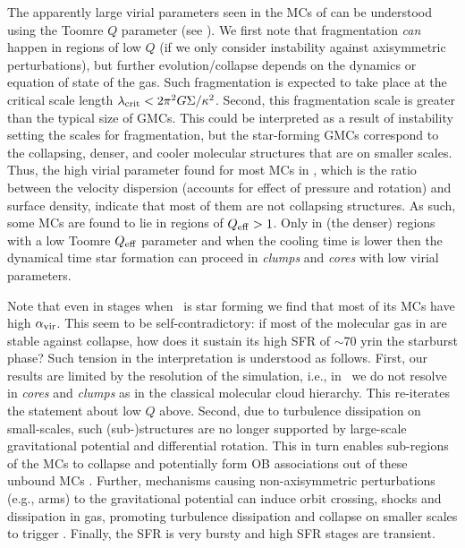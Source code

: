 \IfFileExists{emulateapjlegacy.cls}{\documentclass[iop]{emulateapjlegacy}}{\documentclass[iop]{emulateapj}}
\begin{document}
The apparently large virial parameters seen in the MCs of \flower can be understood using the Toomre $Q$ parameter (see ). We first note that fragmentation {\it can} happen in regions of low $Q$ (if we only consider instability against axisymmetric perturbations), but further evolution/collapse depends on the dynamics or equation of state of the gas.
%
Such fragmentation is expected to take place at the critical scale length $\lambda_{\rm crit} < 2 \pi^2 G \Sigma / \kappa^2$. Second, this fragmentation scale is greater than the typical size of GMCs. This could be interpreted as a result of instability setting the scales for fragmentation, but the star-forming GMCs correspond to the collapsing, denser, and cooler molecular structures that are on smaller scales.
%
Thus, the high virial parameter found for most MCs in \flower, which is the ratio between the velocity dispersion (accounts for effect of pressure and rotation) and surface density, indicate that most of them are not collapsing structures. As such, 
some MCs are found to lie in regions of $Q_{\rm eff}>1$.
Only in (the denser) regions with a low Toomre $Q_{\rm eff}$ parameter and when the cooling time is lower then the dynamical time star formation can proceed in {\it clumps} and {\it cores} with low virial parameters.

Note that even in stages when \flower~is star forming we find that most of its MCs have high $\alpha_{\rm vir}$. This seem to be self-contradictory: if most of the molecular gas in \flower are stable against collapse, how does it sustain its high SFR of $\sim$70\,\Msun\,yr\pmOne in the starburst phase? Such tension in the interpretation is understood as follows.
%
First, our results are limited by the resolution of the simulation, i.e., in \flower~we do not resolve \SF in {\it cores} and {\it clumps} as in the classical molecular cloud hierarchy. This re-iterates the statement about low $Q$ above.
%
Second, due to turbulence dissipation on small-scales, such (sub-)structures are no longer supported by large-scale gravitational potential and differential rotation. This in turn enables sub-regions of the MCs to collapse and potentially form OB associations out of these unbound MCs \citep{Clark04a, Clark05a}.
%
Further, mechanisms causing non-axisymmetric perturbations (e.g., arms) to the gravitational potential can induce orbit crossing, shocks and dissipation in gas, promoting turbulence dissipation and collapse on smaller scales to trigger \SF.
Finally, the SFR is very bursty and high SFR stages are transient.
\end{document}
